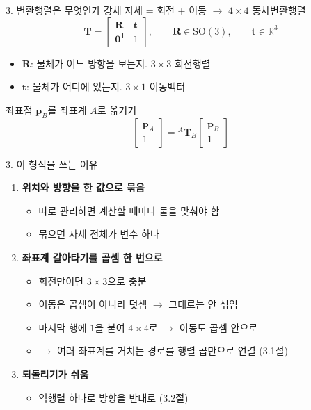 \documentclass[aspectratio=169,11pt]{beamer}
\begin{document}
\begin{frame}{3. 변환행렬은 무엇인가}
  강체 자세 = 회전 + 이동 $\rightarrow$ $4 \times 4$ 동차변환행렬
  \[
    \mathbf{T}
    =
    \begin{bmatrix}
      \mathbf{R} & \mathbf{t} \\
      \mathbf{0}^{\mathsf T} & 1
    \end{bmatrix},
    \qquad
    \mathbf{R}\in\mathrm{SO}(3),
    \qquad
    \mathbf{t}\in\mathbb{R}^{3}
  \]
  \begin{itemize}
    \item $\mathbf{R}$: 물체가 어느 방향을 보는지. $3 \times 3$ 회전행렬
    \item $\mathbf{t}$: 물체가 어디에 있는지. $3 \times 1$ 이동벡터
  \end{itemize}
  \vfill
  좌표점 $\mathbf{p}_B$를 좌표계 $A$로 옮기기
  \[
    \begin{bmatrix} \mathbf{p}_A \\ 1 \end{bmatrix}
    =
    {}^{A}\mathbf{T}_{B}
    \begin{bmatrix} \mathbf{p}_B \\ 1 \end{bmatrix}
  \]
\end{frame}

\begin{frame}{3. 이 형식을 쓰는 이유}
  \begin{enumerate}
    \item \textbf{위치와 방향을 한 값으로 묶음}
      \begin{itemize}
        \item 따로 관리하면 계산할 때마다 둘을 맞춰야 함
        \item 묶으면 자세 전체가 변수 하나
      \end{itemize}
      \vspace{2mm}
    \item \textbf{좌표계 갈아타기를 곱셈 한 번으로}
      \begin{itemize}
        \item 회전만이면 $3 \times 3$으로 충분
        \item 이동은 곱셈이 아니라 덧셈 $\rightarrow$ 그대로는 안 섞임
        \item 마지막 행에 $1$을 붙여 $4 \times 4$로 $\rightarrow$ 이동도 곱셈 안으로
        \item $\rightarrow$ 여러 좌표계를 거치는 경로를 행렬 곱만으로 연결 (3.1절)
      \end{itemize}
      \vspace{2mm}
    \item \textbf{되돌리기가 쉬움}
      \begin{itemize}
        \item 역행렬 하나로 방향을 반대로 (3.2절)
      \end{itemize}
  \end{enumerate}
\end{frame}
\end{document}
